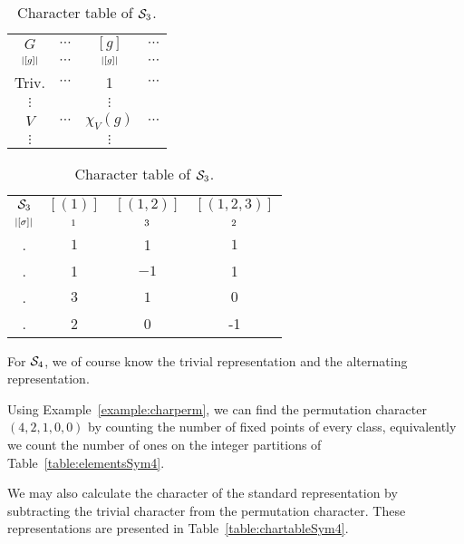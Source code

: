 \begin{table}[hbt!]
	\centering
	\parbox[t]{.45\linewidth}{
		\centering
		\begin{tabular}{c | c c c }
			$G$    & $\cdots $ & $[g]$        & $\cdots$ \\ 
			$\scriptstyle|[g]|$ & $\cdots$ & $\scriptstyle|[g]|$ & $\cdots$ \\ \hline
			Triv.   & $\cdots$  & 1            & $\cdots$ \\
			$\vdots$ &           & $\vdots$     &          \\
			$V$    & $\cdots$  & $\chi_V(g) $ & $\cdots$ \\
			$\vdots$ &           & $\vdots$     &
		\end{tabular}
		\caption{Layout of a character table of a group $G$.}
		\label{table:chartableexample}
	}
	\hfill
	\parbox[t]{.45\linewidth}{
		\centering
		\begin{tabular}{c | c c c }
			$\mathcal{S}_3$  & $[(1)]$ & $[(1,2)]$ & $[(1,2,3)]$ \\ 
			$\scriptstyle|[\sigma]|$ & $\scriptstyle1$ & $\scriptstyle3$ & $\scriptstyle2$ \\ \hline
			\Triv. & $1$     & 1         & $1$       \\
			\Alt.  & 1       & $-1$      & 1         \\
			\Perm. & $3$     & $1$       & $0$       \\
			\Stan. & 2       & 0         & -1        
		\end{tabular}
		\caption{Character table of $\mathcal{S}_3$.}
		\label{table:chartableSym3}
	}
\end{table}




\begin{example}
	For $\mathcal{S}_4$, we of course know the trivial representation and the alternating representation. 
	
	Using Example~\ref{example:charperm}, we can find the permutation character $(4,2,1,0,0)$ by counting the number of fixed points of every class, equivalently we count the number of ones on the integer partitions of Table~\ref{table:elementsSym4}. 
	
	We may also calculate the character of the standard representation by subtracting the trivial character from the permutation character. These representations are presented in Table~\ref{table:chartableSym4}.
\end{example}

